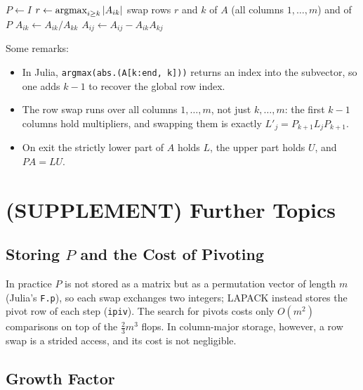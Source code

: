 \begin{algorithm}[H]
  \caption{LU factorization with partial pivoting, in place.}
  \label{alg:gepp}
  \begin{algorithmic}[1]
    \State $P \gets I$
      \State $r \gets \operatorname{argmax}_{i \ge k}\left\lvert A_{ik} \right\rvert$
      \State swap rows $r$ and $k$ of $A$ (all columns $1, \dots, m$) and of $P$
        \State $A_{ik} \gets A_{ik}/A_{kk}$
      \EndFor
          \State $A_{ij} \gets A_{ij} - A_{ik}A_{kj}$
        \EndFor
      \EndFor
    \EndFor
  \end{algorithmic}
\end{algorithm}

Some remarks:
\begin{itemize}
  \item In Julia, \texttt{argmax(abs.(A[k:end, k]))} returns an index into the subvector, so one adds $k - 1$ to recover the global row index.
  \item The row swap runs over all columns $1, \dots, m$, not just $k, \dots, m$: the first $k - 1$ columns hold multipliers, and swapping them is exactly $L'_j = P_{k+1}L_jP_{k+1}$.
  \item On exit the strictly lower part of $A$ holds $L$, the upper part holds $U$, and $PA = LU$.
\end{itemize}

\section{(SUPPLEMENT) Further Topics}
\label{sec:pivot-further}
\subsection{Storing $P$ and the Cost of Pivoting}

In practice $P$ is not stored as a matrix but as a permutation vector of length $m$ (Julia's \texttt{F.p}), so each swap exchanges two integers; LAPACK instead stores the pivot row of each step (\texttt{ipiv}). The search for pivots costs only $O(m^2)$ comparisons on top of the $\tfrac{2}{3}m^3$ flops. In column-major storage, however, a row swap is a strided access, and its cost is not negligible.

\subsection{Growth Factor}

